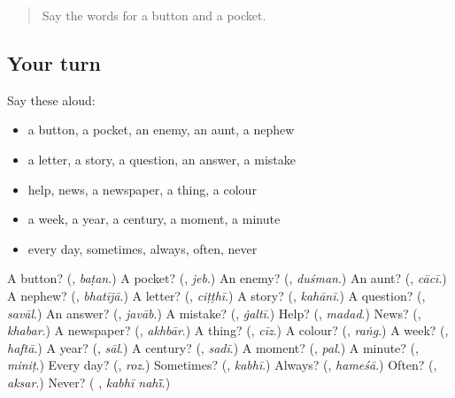 \begin{quote}
Say the words for a button and a pocket.
\end{quote}

\subsection*{Your turn}
Say these aloud:

\begin{itemize}
\raggedright
  \item a button, a pocket, an enemy, an aunt, a nephew
  \item a letter, a story, a question, an answer, a mistake
  \item help, news, a newspaper, a thing, a colour
  \item a week, a year, a century, a moment, a minute
  \item every day, sometimes, always, often, never
\end{itemize}

\begin{tcolorbox}[breakable,colback=teal!4,colframe=teal!35!black,title={Before you move on}]
A button? (\textbf{}, \emph{baṭan}.) A pocket? (\textbf{}, \emph{jeb}.) An enemy? (\textbf{}, \emph{duśman}.) An aunt? (\textbf{}, \emph{cācī}.) A nephew? (\textbf{}, \emph{bhatījā}.) A letter? (\textbf{}, \emph{ciṭṭhī}.) A story? (\textbf{}, \emph{kahānī}.) A question? (\textbf{}, \emph{savāl}.) An answer? (\textbf{}, \emph{javāb}.) A mistake? (\textbf{}, \emph{ġaltī}.) Help? (\textbf{}, \emph{madad}.) News? (\textbf{}, \emph{khabar}.) A newspaper? (\textbf{}, \emph{akhbār}.) A thing? (\textbf{}, \emph{cīz}.) A colour? (\textbf{}, \emph{raṅg}.) A week? (\textbf{}, \emph{haftā}.) A year? (\textbf{}, \emph{sāl}.) A century? (\textbf{}, \emph{sadī}.) A moment? (\textbf{}, \emph{pal}.) A minute? (\textbf{}, \emph{miniṭ}.) Every day? (\textbf{}, \emph{roz}.) Sometimes? (\textbf{}, \emph{kabhī}.) Always? (\textbf{}, \emph{hameśā}.) Often? (\textbf{}, \emph{aksar}.) Never? (\textbf{ }, \emph{kabhī nahī̃}.)
\end{tcolorbox}
